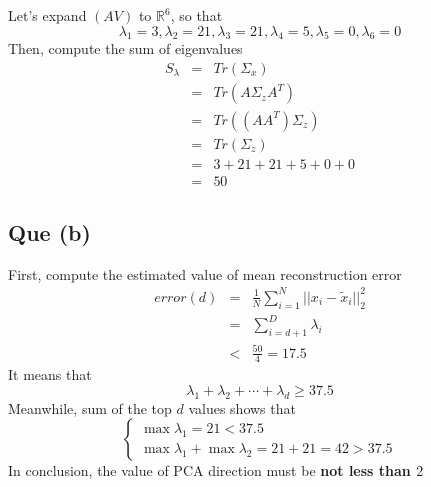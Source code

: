 \documentclass[12pt,letterpaper]{article}
\begin{document}
Let's expand $(AV)$ to $\mathbb{R}^6$, so that
\begin{equation}
	\lambda_1=3,
	\lambda_2=21,
	\lambda_3=21,
	\lambda_4=5,
	\lambda_5=0,
	\lambda_6=0
\end{equation}
Then, compute the sum of eigenvalues
\begin{eqnarray}
	S_\lambda
	&=& Tr(\Sigma_x)\\
	&=& Tr(A\Sigma_zA^T)\nonumber\\
	&=& Tr((AA^T)\Sigma_z)\nonumber\\
	&=& Tr(\Sigma_z)\nonumber\\
	&=& 3+21+21+5+0+0\nonumber\\
	&=& 50\nonumber
\end{eqnarray}

\subsection*{Que (b)}
First, compute the estimated value of mean reconstruction error
\begin{eqnarray}
	error(d)
	&=& \frac1N\sum^N_{i=1}||x_i-\tilde{x}_i||^2_2\\
	&=& \sum^D_{i=d+1}\lambda_i\nonumber\\
	&<& \frac{50}4=17.5\nonumber
\end{eqnarray}
It means that
\begin{equation}
	\lambda_1+\lambda_2+\cdots+\lambda_d\geq37.5
\end{equation}
Meanwhile, sum of the top $d$ values shows that
\begin{equation}
\begin{cases}
	\max\lambda_1=21<37.5\\
	\max\lambda_1+\max\lambda_2=21+21=42>37.5
\end{cases}
\end{equation}
In conclusion, the value of PCA direction must be \textbf{not less than $2$}
\end{document}
